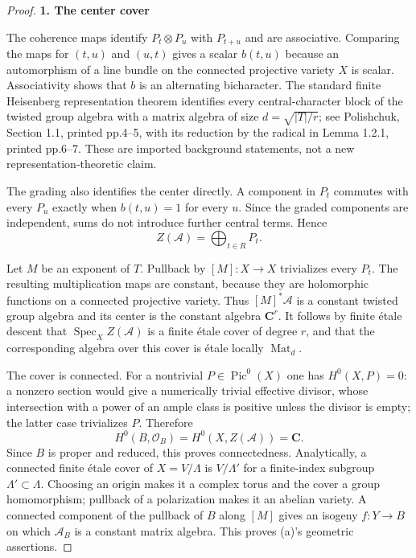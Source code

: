 \begin{proof}
\par

\medskip\noindent\textbf{1. The center cover}\quad

The coherence maps identify \(P_t\otimes P_u\) with \(P_{t+u}\) and are associative. Comparing the maps for \((t,u)\) and \((u,t)\) gives a scalar \(b(t,u)\) because an automorphism of a line bundle on the connected projective variety \(X\) is scalar. Associativity shows that \(b\) is an alternating bicharacter. The standard finite Heisenberg representation theorem identifies every central-character block of the twisted group algebra with a matrix algebra of size \(d=\sqrt{|T|/r}\); see Polishchuk, Section 1.1, printed pp.4--5, with its reduction by the radical in Lemma 1.2.1, printed pp.6--7. These are imported background statements, not a new representation-theoretic claim.

The grading also identifies the center directly. A component in \(P_t\) commutes with every \(P_u\) exactly when \(b(t,u)=1\) for every \(u\). Since the graded components are independent, sums do not introduce further central terms. Hence \[
 Z(\mathscr A)=\bigoplus_{t\in R}P_t.
 \tag{S38.12}
\]

Let \(M\) be an exponent of \(T\). Pullback by \([M]:X\to X\) trivializes every \(P_t\). The resulting multiplication maps are constant, because they are holomorphic functions on a connected projective variety. Thus \([M]^*\mathscr A\) is a constant twisted group algebra and its center is the constant algebra \(\mathbf C^r\). It follows by finite étale descent that \(\operatorname{Spec}_X Z(\mathscr A)\) is a finite étale cover of degree \(r\), and that the corresponding algebra over this cover is étale locally \(\operatorname{Mat}_d\).

The cover is connected. For a nontrivial \(P\in\operatorname{Pic}^0(X)\) one has \(H^0(X,P)=0\): a nonzero section would give a numerically trivial effective divisor, whose intersection with a power of an ample class is positive unless the divisor is empty; the latter case trivializes \(P\). Therefore \[
 H^0(B,\mathcal O_B)=H^0(X,Z(\mathscr A))=\mathbf C.
\] Since \(B\) is proper and reduced, this proves connectedness. Analytically, a connected finite étale cover of \(X=V/\Lambda\) is \(V/\Lambda'\) for a finite-index subgroup \(\Lambda'\subset\Lambda\). Choosing an origin makes it a complex torus and the cover a group homomorphism; pullback of a polarization makes it an abelian variety. A connected component of the pullback of \(B\) along \([M]\) gives an isogeny \(f:Y\to B\) on which \(\mathscr A_B\) is a constant matrix algebra. This proves (a)'s geometric assertions.


\end{proof}

